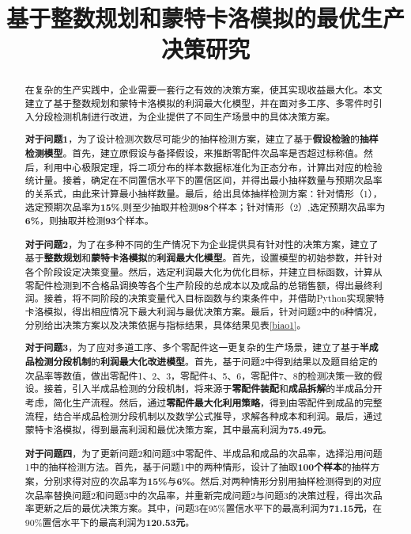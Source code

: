 \documentclass[withoutpreface,bwprint]{cumcmthesis} %
\title{基于整数规划和蒙特卡洛模拟的最优生产决策研究}
\begin{document}
\maketitle
\begin{abstract}

在复杂的生产实践中，企业需要一套行之有效的决策方案，使其实现收益最大化。本文建立了基于整数规划和蒙特卡洛模拟的利润最大化模型，并在面对多工序、多零件时引入分段检测机制进行改进，为企业提供了不同生产场景中的具体决策方案。

\textbf{对于问题1}，为了设计检测次数尽可能少的抽样检测方案，建立了基于\textbf{假设检验}的\textbf{抽样检测模型}。首先，建立原假设与备择假设，来推断零配件次品率是否超过标称值。然后，利用中心极限定理，将二项分布的样本数据标准化为正态分布，计算出对应的检验统计量。接着，确定在不同置信水平下的置信区间，并得出最小抽样数量与预期次品率的关系式，由此来计算最小抽样数量。最后，给出具体抽样检测方案：针对情形（1），选定预期次品率为\textbf{15\%},则至少抽取并检测\textbf{98}个样本；针对情形（2）,选定预期次品率为\textbf{6\%}，则抽取并检测\textbf{93}个样本。

\textbf{对于问题2}，为了在多种不同的生产情况下为企业提供具有针对性的决策方案，建立了基于\textbf{整数规划}和\textbf{蒙特卡洛模拟}的\textbf{利润最大化模型}。首先，设置模型的初始参数，并针对各个阶段设定决策变量。然后，选定利润最大化为优化目标，并建立目标函数，计算从零配件检测到不合格品调换等各个生产阶段的总成本以及成品的总销售额，得出最终利润。接着，将不同阶段的决策变量代入目标函数与约束条件中，并借助Python实现蒙特卡洛模拟，得出相应情况下最大利润与最优决策方案。最后，针对问题2中的6种情况，分别给出决策方案以及决策依据与指标结果，具体结果见表\ref{biao1}。

\textbf{对于问题3}，为了应对多道工序、多个零配件这一更复杂的生产场景，建立了基于\textbf{半成品检测分段机制}的\textbf{利润最大化改进模型}。首先，基于问题2中得到结果以及题目给定的次品率等数值，做出零配件1、2、3，零配件4、5、6，零配件7、8的检测决策一致的假设。接着，引入半成品检测的分段机制，将来源于\textbf{零配件装配}和\textbf{成品拆解}的半成品分开考虑，简化生产流程。然后，通过\textbf{零配件最大化利用策略}，得到由零配件到成品的完整流程，结合半成品检测分段机制以及数学公式推导，求解各种成本和利润。最后，通过蒙特卡洛模拟，得到最高利润和最优决策方案，其中最高利润为\textbf{75.49元}。

\textbf{对于问题四}，为了更新问题2和问题3中零配件、半成品和成品的次品率，选择沿用问题1中的抽样检测方法。首先，基于问题1中的两种情形，设计了抽取\textbf{100个样本}的抽样方案，分别求得对应的次品率为\textbf{15\%}与\textbf{6\%}。然后,对两种情形分别用抽样检测得到的对应次品率替换问题2和问题3中的次品率，并重新完成问题2与问题3的决策过程，得出次品率更新之后的最优决策方案。其中，问题3在95\%置信水平下的最高利润为\textbf{71.15元}，在90\%置信水平下的最高利润为\textbf{120.53元}。



\end{abstract}
\end{document}
